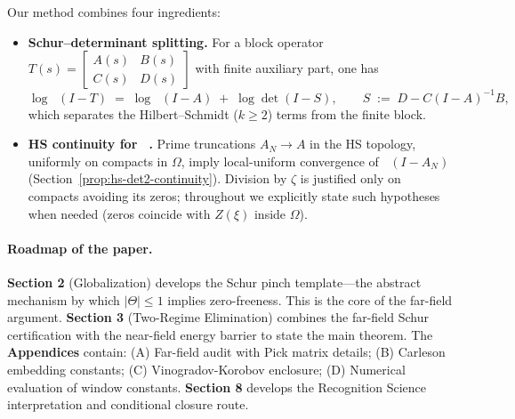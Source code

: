 \documentclass[11pt]{article}
\theoremstyle{definition}
\theoremstyle{remark}
\theoremstyle{definition}
\DeclareMathOperator{\dettwo}{det_2}
\begin{document}
Our method combines four ingredients:
\begin{itemize}
 \item \textbf{Schur--determinant splitting.} For a block operator \(T(s)=\begin{bmatrix}A(s)&B(s)\\ C(s)&D(s)\end{bmatrix}\) with finite auxiliary part, one has
 \[
  \log\dettwo(I-T)\;=\;\log\dettwo(I-A)\; +\; \log\det(I-S),\qquad S\;:=\;D-C(I-A)^{-1}B,
 \]
 which separates the Hilbert--Schmidt (\(k\ge 2\)) terms from the finite block.
 \item \textbf{HS continuity for \(\dettwo\).} Prime truncations \(A_N\to A\) in the HS topology, uniformly on compacts in \(\Omega\), imply local-uniform convergence of \(\dettwo(I-A_N)\) (Section~\ref{prop:hs-det2-continuity}). Division by \(\zeta\) is justified only on compacts avoiding its zeros; throughout we explicitly state such hypotheses when needed (zeros coincide with \(Z(\xi)\) inside \(\Omega\)).
\end{itemize}

\paragraph{Roadmap of the paper.}
\textbf{Section 2} (Globalization) develops the Schur pinch template---the abstract mechanism by which $|\Theta| \le 1$ implies zero-freeness. This is the core of the far-field argument.
\textbf{Section 3} (Two-Regime Elimination) combines the far-field Schur certification with the near-field energy barrier to state the main theorem.
The \textbf{Appendices} contain: (A) Far-field audit with Pick matrix details; (B) Carleson embedding constants; (C) Vinogradov-Korobov enclosure; (D) Numerical evaluation of window constants.
\textbf{Section 8} develops the Recognition Science interpretation and conditional closure route.

\end{document}
